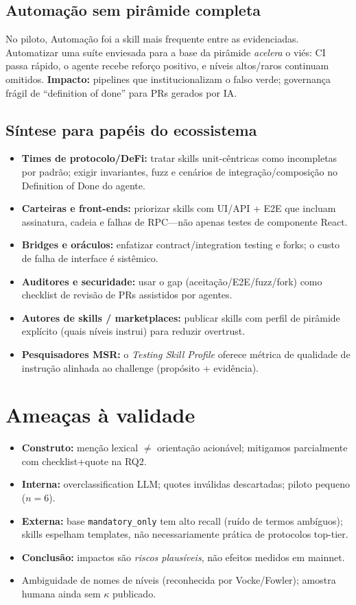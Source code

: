 \documentclass[10pt,conference]{IEEEtran}
\begin{document}
\subsection{Automação sem pirâmide completa}
No piloto, Automação foi a skill mais frequente entre as evidenciadas.
Automatizar uma suíte enviesada para a base da pirâmide \emph{acelera} o viés: CI passa rápido, o agente recebe reforço positivo, e níveis altos/raros continuam omitidos.
\textbf{Impacto:} pipelines que institucionalizam o falso verde; governança frágil de ``definition of done'' para PRs gerados por IA.

\subsection{Síntese para papéis do ecossistema}
\begin{itemize}[leftmargin=*,itemsep=2pt]
\item \textbf{Times de protocolo/DeFi:} tratar skills unit-cêntricas como incompletas por padrão; exigir invariantes, fuzz e cenários de integração/composição no Definition of Done do agente.
\item \textbf{Carteiras e front-ends:} priorizar skills com UI/API + E2E que incluam assinatura, cadeia e falhas de RPC---não apenas testes de componente React.
\item \textbf{Bridges e oráculos:} enfatizar contract/integration testing e forks; o custo de falha de interface é sistêmico.
\item \textbf{Auditores e securidade:} usar o gap (aceitação/E2E/fuzz/fork) como checklist de revisão de PRs assistidos por agentes.
\item \textbf{Autores de skills / marketplaces:} publicar skills com perfil de pirâmide explícito (quais níveis instrui) para reduzir overtrust.
\item \textbf{Pesquisadores MSR:} o \emph{Testing Skill Profile} oferece métrica de qualidade de instrução alinhada ao challenge (propósito + evidência).
\end{itemize}

\section{Ameaças à validade}

\begin{itemize}[leftmargin=*,itemsep=1pt]
\item \textbf{Construto:} menção lexical $\neq$ orientação acionável; mitigamos parcialmente com checklist+quote na RQ2.
\item \textbf{Interna:} overclassification LLM; quotes inválidas descartadas; piloto pequeno ($n{=}6$).
\item \textbf{Externa:} base \texttt{mandatory\_only} tem alto recall (ruído de termos ambíguos); skills espelham templates, não necessariamente prática de protocolos top-tier.
\item \textbf{Conclusão:} impactos são \emph{riscos plausíveis}, não efeitos medidos em mainnet.
\item Ambiguidade de nomes de níveis (reconhecida por Vocke/Fowler); amostra humana ainda sem $\kappa$ publicado.
\end{itemize}
\end{document}
